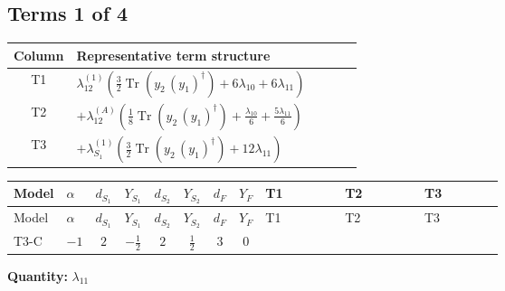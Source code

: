 \documentclass[8pt]{article}
\begin{document}
\begin{landscape}
\subsection*{Terms 1 of 4}
\begin{center}
\begin{tabular}{@{}c >{\raggedright\arraybackslash}p{0.82\linewidth}@{}}
\toprule
Column & Representative term structure \\
\midrule
T1 & \(\displaystyle {\lambda_{12}^{(1)}} \left(\frac{3}{2} \operatorname{Tr}\!\left({y_2}\,\left({y_1}\right)^{\dagger}\right)+6 {\lambda_{10}}+6 {\lambda_{11}}\right)\) \\
\midrule
T2 & \(\displaystyle +{\lambda_{12}^{(A)}} \left(\frac{1}{8} \operatorname{Tr}\!\left({y_2}\,\left({y_1}\right)^{\dagger}\right)+\frac{{\lambda_{10}}}{6}+\frac{5 {\lambda_{11}}}{6}\right)\) \\
\midrule
T3 & \(\displaystyle +{\lambda_{S_1}^{(1)}} \left(\frac{3}{2} \operatorname{Tr}\!\left({y_2}\,\left({y_1}\right)^{\dagger}\right)+12 {\lambda_{11}}\right)\) \\
\midrule
\bottomrule
\end{tabular}
\end{center}
\smallskip
\tiny
\begin{longtable}{@{}llcccccc >{\raggedright\arraybackslash}p{0.21\linewidth} >{\raggedright\arraybackslash}p{0.21\linewidth} >{\raggedright\arraybackslash}p{0.21\linewidth}@{}}
\toprule
Model & $\alpha$ & $d_{S_1}$ & $Y_{S_1}$ & $d_{S_2}$ & $Y_{S_2}$ & $d_F$ & $Y_F$ & T1 & T2 & T3 \\
\midrule
\endfirsthead
\toprule
Model & $\alpha$ & $d_{S_1}$ & $Y_{S_1}$ & $d_{S_2}$ & $Y_{S_2}$ & $d_F$ & $Y_F$ & T1 & T2 & T3 \\
\midrule
\endhead
T3-C & $-1$ & $2$ & $-\frac{1}{2}$ & $2$ & $\frac{1}{2}$ & $3$ & $0$ & \scriptsize\adjustbox{max width=\linewidth}{$\begin{gathered} {\lambda_{12}^{(1)}} \left(\frac{3}{2} \operatorname{Tr}\!\left({y_2}\,\left({y_1}\right)^{\dagger}\right)+6 {\lambda_{10}}+6 {\lambda_{11}}\right)\end{gathered}$} & \scriptsize\adjustbox{max width=\linewidth}{$\begin{gathered} +{\lambda_{12}^{(A)}} \left(\frac{1}{8} \operatorname{Tr}\!\left({y_2}\,\left({y_1}\right)^{\dagger}\right)+\frac{{\lambda_{10}}}{6}+\frac{5 {\lambda_{11}}}{6}\right)\end{gathered}$} & \scriptsize\adjustbox{max width=\linewidth}{$\begin{gathered} +{\lambda_{S_1}^{(1)}} \left(\frac{3}{2} \operatorname{Tr}\!\left({y_2}\,\left({y_1}\right)^{\dagger}\right)+12 {\lambda_{11}}\right)\end{gathered}$} \\
\midrule
\bottomrule
\end{longtable}
\clearpage
\noindent\textbf{Quantity: }$\lambda_{11}$\par\smallskip

\end{landscape}
\end{document}
